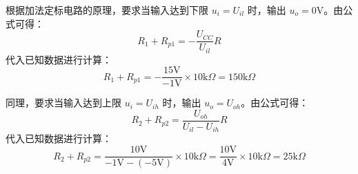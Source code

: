 ﻿\documentclass[10.5pt]{config}
\begin{document}
\begin{enumerate}[label=\arabic*., leftmargin=2em]
根据加法定标电路的原理，要求当输入达到下限 $u_i = U_{il}$ 时，输出 $u_o = 0\mathrm{V}$。由公式可得：
\begin{equation*}
    R_1 + R_{p1} = -\frac{U_{CC}}{U_{il}} R
\end{equation*}
代入已知数据进行计算：
\begin{equation*}
    R_1 + R_{p1} = -\frac{15\mathrm{V}}{-1\mathrm{V}} \times 10\mathrm{k}\Omega = 150\mathrm{k}\Omega
\end{equation*}

同理，要求当输入达到上限 $u_i = U_{ih}$ 时，输出 $u_o = U_{oh}$。由公式可得：
\begin{equation*}
    R_2 + R_{p2} = \frac{U_{oh}}{U_{il} - U_{ih}} R
\end{equation*}
代入已知数据进行计算：
\begin{equation*}
    R_2 + R_{p2} = \frac{10\mathrm{V}}{-1\mathrm{V} - (-5\mathrm{V})} \times 10\mathrm{k}\Omega = \frac{10\mathrm{V}}{4\mathrm{V}} \times 10\mathrm{k}\Omega = 25\mathrm{k}\Omega
\end{equation*}



\end{enumerate}
\end{document}
